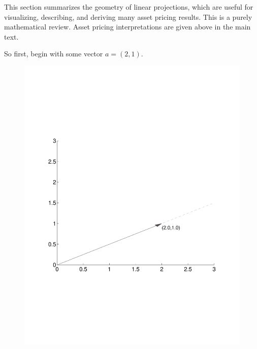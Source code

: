 \documentclass[a4paper,12pt]{scrartcl}
\begin{document}
This section summarizes the geometry of linear projections, which are
useful for visualizing, describing, and deriving many asset pricing
results. This is a purely mathematical review. Asset pricing
interpretations are given above in the main text.

So first, begin with some vector $a=(2,1)$.
\begin{figure}[htpb!]
  \centering
  \includegraphics[scale=0.5, trim={2cm, 7cm, 2cm, 7cm}, clip]{Plots/StateSpaceGeometry1.pdf}
\end{figure}
\end{document}
